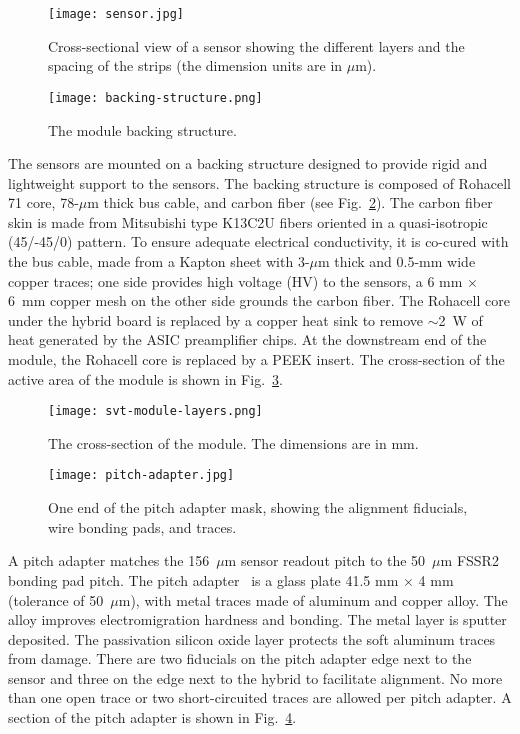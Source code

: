 \begin{figure}[hbt] 
\centering 
\texttt{[image: sensor.jpg]}
\caption{Cross-sectional view of a sensor showing the different layers and the spacing of the strips (the dimension units are in $\mu$m).}
\label{fig:sensor}
\end{figure}

\begin{figure}[hbt] 
\centering 
\texttt{[image: backing-structure.png]}
\caption{The module backing structure.}
\label{fig:backing-structure}
\end{figure}

The sensors are mounted on a backing structure designed to provide rigid and lightweight support to the sensors. The backing structure is composed of Rohacell 71 core, 78-$\mu$m thick bus cable, and carbon fiber (see Fig.~\ref{fig:backing-structure}). The carbon fiber skin is made from Mitsubishi type K13C2U fibers oriented in a quasi-isotropic (45/-45/0) pattern. To ensure adequate electrical conductivity, it is co-cured with the bus cable, made from a Kapton sheet with 3-$\mu$m thick and 0.5-mm wide copper traces; one side provides high voltage (HV) to the sensors, a 6 mm $\times$ 6~mm copper mesh on the other side grounds the carbon fiber.  The Rohacell core under the hybrid board is replaced by a copper heat sink to remove $\sim$2~W of heat generated by the ASIC preamplifier chips. At the downstream end of the module, the Rohacell core is replaced by a PEEK insert. The cross-section of the active area of the module is shown in Fig.~\ref{fig:svt-module-layers}. 

\begin{figure}[hbt] 
\centering 
\texttt{[image: svt-module-layers.png]}
\caption{The cross-section of the module. The dimensions are in mm.}
\label{fig:svt-module-layers}
\end{figure}

\begin{figure}[hbt] 
\centering 
\texttt{[image: pitch-adapter.jpg]}
\caption{One end of the pitch adapter mask, showing the alignment fiducials, wire bonding pads, and traces.}
\label{fig:pitch-adapter}
\end{figure}

A pitch adapter matches the 156~$\mu$m sensor readout pitch to the 50~$\mu$m FSSR2 bonding pad pitch. The pitch adapter~\cite{PA} is a glass plate 41.5 mm $\times$ 4 mm (tolerance of 50~$\mu$m), with metal traces made of aluminum and copper alloy. The alloy improves electromigration hardness and bonding. The metal layer is sputter deposited. The passivation silicon oxide layer protects the soft aluminum traces from damage. There are two fiducials on the pitch adapter edge next to the sensor and three on the edge next to the hybrid to facilitate alignment. No more than one open trace or two short-circuited traces are allowed per pitch adapter. A section of the pitch adapter is shown in Fig.~\ref{fig:pitch-adapter}. 

